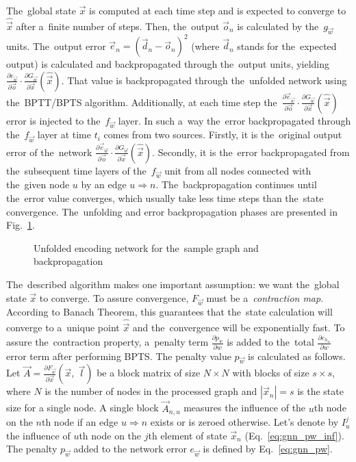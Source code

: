 \documentclass{llncs}
\begin{document}
\noindent The~global state $\vec{x}$ is computed at each time step and is expected to converge to $\hat{\vec{x}}$ after a~finite number of steps. Then, the~output $\vec{o}_n$ is calculated by the~$g_{\vec{w}}$ units. The~output error $\vec{e}_n = (\vec{d}_n - \vec{o}_n)^2$ (where $\vec{d}_n$ stands for the~expected output) is calculated and backpropagated through the~output units, yielding $\frac{\partial e_{\vec{w}}}{\partial \vec{o}}\cdot \frac{\partial G_{\vec{w}}}{\partial \vec{x}}(\hat{\vec{x}})$. That value is backpropagated through the~unfolded network using the~BPTT/BPTS algorithm. Additionally, at each time step the~$\frac{\partial \vec{e}_{\vec{w}}}{\partial \vec{o}}\cdot \frac{\partial G_{\vec{w}}}{\partial \vec{x}}(\hat{\vec{x}})$ error is injected to the~$f_{\vec{w}}$ layer. In such a~way the~error backpropagated through the~$f_{\vec{w}}$ layer at time $t_i$ comes from two sources. Firstly, it is the~original output error of the~network $\frac{\partial \vec{e}_{\vec{w}}}{\partial \vec{o}}\cdot \frac{\partial G_{\vec{w}}}{\partial \vec{x}}(\hat{\vec{x}})$. Secondly, it is the~error backpropagated from the~subsequent time layers of the~$f_{\vec{w}}$ unit from all nodes connected with the~given node $u$ by an edge $u \Rightarrow n$. The~backpropagation continues until the~error value converges, which usually take less time steps than the~state convergence. The~unfolding and error backpropagation phases are presented in Fig.~\ref{fig:gnn_forback}.
\\

\begin{figure}[h!]
\begin{center}
	\caption[]{Unfolded encoding network for the~sample graph and backpropagation}
	\label{fig:gnn_forback}
\end{center}
\end{figure}

\noindent The~described algorithm makes one important assumption: we want the~global state $\vec{x}$ to converge. To assure convergence, $F_{\vec{w}}$ must be a~\emph{contraction map}. According to Banach Theorem, this guarantees that the~state calculation will converge to a~unique point $\hat{\vec{x}}$ and the~convergence will be exponentially fast. To assure the~contraction property, a~penalty term $\frac{\partial p_{w}}{\partial w}$ is added to the~total $\frac{\partial e_{h_w}}{\partial w}$ error term after performing BPTS. The penalty value $p_{\vec{w}}$ is calculated as follows.
Let $\vec{A} = \frac{\partial F_{\vec{w}}}{\partial \vec{x}}(\vec{x}, \; \vec{l})$ be a block matrix of size $N \times N$ with blocks of size $s \times s$, where $N$ is the number of nodes in the processed graph and $|\vec{x}_n| = s$ is the state size for a single node. A single block $\vec{A}_{n,u}$ measures the influence of the $u$th node on the $n$th node if an edge $u \Rightarrow n$ exists or is zeroed otherwise. Let's denote by $I_u^j$ the influence of $u$th node on the $j$th element of state $\vec{x}_n$ (Eq.~\ref{eq:gnn_pw_inf}). The penalty $p_{\vec{w}}$ added to the network error $e_{\vec{w}}$ is defined by Eq.~\ref{eq:gnn_pw}.
\end{document}
